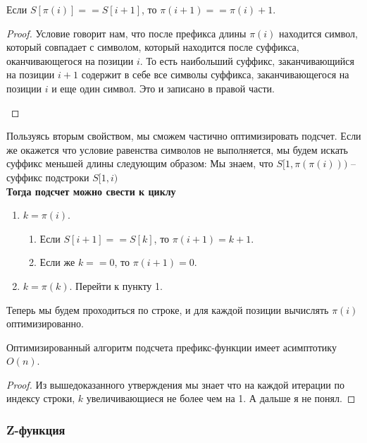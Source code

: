 \begin{prop}
	Если $S[\pi(i)] == S[i + 1]$, то  $\pi(i + 1) == \pi(i) + 1$.
\end{prop}
\begin{proof}
	Условие говорит нам, что после префикса длины $\pi(i)$ находится символ, который совпадает с символом, который находится после суффикса, оканчивающегося на позиции $i$. То есть наибольший суффикс, заканчивающийся на позиции $i + 1$ содержит в себе все символы суффикса, заканчивающегося на позиции $i$ и еще один символ. Это и записано в правой части.
	\begin{center}
	\end{center}
\end{proof}

Пользуясь вторым свойством, мы сможем частично оптимизировать подсчет. Если же окажется что условие равенства символов не выполняется, мы будем искать суффикс меньшей длины следующим образом:
Мы знаем, что $S[1, \pi(\pi(i)))$ -- суффикс подстроки  $S[1, i)$ \\

\textbf{Тогда подсчет можно свести к циклу}
\begin{enumerate}
\setcounter{enumi}{0}
	\item $k = \pi(i)$.
	\begin{enumerate}
		\item Если $S[i + 1] == S[k]$, то $\pi(i + 1) = k + 1$.
		\item Если же $k == 0$, то $\pi(i + 1) = 0$.
	\end{enumerate}
	\item $k = \pi(k)$. Перейти к пункту 1.
\end{enumerate}

Теперь мы будем проходиться по строке, и для каждой позиции вычислять $\pi(i)$ оптимизированно.

\begin{prop}
	Оптимизированный алгоритм подсчета префикс-функции имеет асимптотику $O(n)$.	
\end{prop}
\begin{proof}
	Из вышедоказанного утверждения мы знает что на каждой итерации по индексу строки, $k$ увеличивающиеся не более чем на 1.
	А дальше я не понял.
\end{proof}

\subsubsection{Z-функция}

